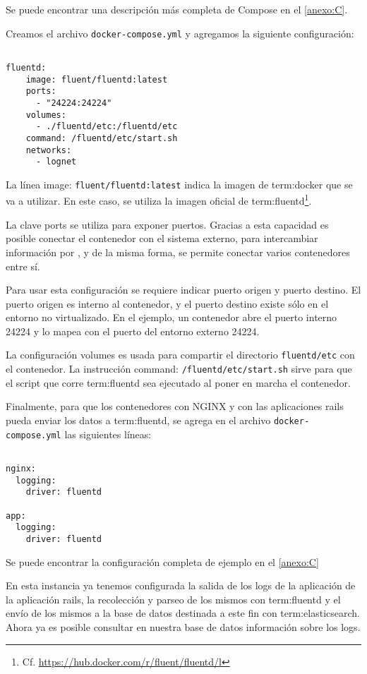 Se puede encontrar una descripción más completa de Compose en el \autoref{anexo:C}.

Creamos el archivo \texttt{docker-compose.yml} y agregamos la siguiente
configuración:

\begin{lstlisting}

fluentd:
    image: fluent/fluentd:latest
    ports:
      - "24224:24224"
    volumes:
      - ./fluentd/etc:/fluentd/etc
    command: /fluentd/etc/start.sh
    networks:
      - lognet

\end{lstlisting}

La línea image: \lstinline{fluent/fluentd:latest} indica la imagen de
\gls{term:docker} que se va a utilizar. En este caso, se utiliza la imagen
oficial de \gls{term:fluentd}\footnote{Cf.
\url{https://hub.docker.com/r/fluent/fluentd/l}}.

La clave ports se utiliza para exponer puertos. Gracias a esta capacidad es
posible conectar el contenedor con el sistema externo, para intercambiar
información por , y de la misma forma, se permite conectar varios
contenedores entre sí.

Para usar esta configuración se requiere indicar puerto origen y puerto
destino. El puerto origen es interno al contenedor, y el puerto destino existe
sólo en el entorno no virtualizado. En el ejemplo, un contenedor abre el puerto
interno 24224 y lo mapea con el puerto del entorno externo 24224.

La configuración volumes es usada para compartir el directorio
\lstinline{fluentd/etc} con el contenedor. La instrucción command:
\texttt{/fluentd/etc/start.sh} sirve para que el script que corre
\gls{term:fluentd} sea ejecutado al poner en marcha el contenedor.

Finalmente, para que los contenedores con NGINX y con las aplicaciones rails
pueda enviar los datos a \gls{term:fluentd}, se agrega en el archivo
\texttt{docker-compose.yml} las siguientes líneas:

\begin{lstlisting}

nginx:
  logging:
    driver: fluentd

app:
  logging:
    driver: fluentd

\end{lstlisting}

Se puede encontrar la configuración completa de ejemplo en el \autoref{anexo:C}

En esta instancia ya tenemos configurada la salida de los logs de la aplicación
de la aplicación rails, la recolección y parseo de los mismos con
\gls{term:fluentd} y el envío de los mismos a la base de datos destinada a este
fin con \gls{term:elasticsearch}. Ahora ya es posible consultar en nuestra base
de datos información sobre los logs.

